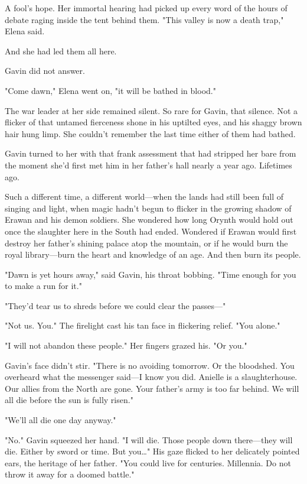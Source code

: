 A fool's hope.
Her immortal hearing had picked up every word of the hours of debate raging inside the tent behind them.
"This valley is now a death trap," Elena said.

And she had led them all here.

Gavin did not answer.

"Come dawn," Elena went on, "it will be bathed in blood."

The war leader at her side remained silent.
So rare for Gavin, that silence.
Not a flicker of that untamed fierceness shone in his uptilted eyes, and his shaggy brown hair hung limp.
She couldn't remember the last time either of them had bathed.

Gavin turned to her with that frank assessment that had stripped her bare from the moment she'd first met him in her father's hall nearly a year ago.
Lifetimes ago.

Such a different time, a different world---when the lands had still been full of singing and light, when magic hadn't begun to flicker in the growing shadow of Erawan and his demon soldiers.
She wondered how long Orynth would hold out once the slaughter here in the South had ended.
Wondered if Erawan would first destroy her father's shining palace atop the mountain, or if he would burn the royal library---burn the heart and knowledge of an age.
And then burn its people.

"Dawn is yet hours away," said Gavin, his throat bobbing.
"Time enough for you to make a run for it."

"They'd tear us to shreds before we could clear the passes---"

"Not us.
You."
The firelight cast his tan face in flickering relief.
"You alone."

"I will not abandon these people."
Her fingers grazed his.
"Or you."

Gavin's face didn't stir.
"There is no avoiding tomorrow.
Or the bloodshed.
You overheard what the messenger said---I know you did.
Anielle is a slaughterhouse.
Our allies from the North are gone.
Your father's army is too far behind.
We will all die before the sun is fully risen."

"We'll all die one day anyway."

"No."
Gavin squeezed her hand.
"I will die.
Those people down there---they will die.
Either by sword or time.
But you\ldots" His gaze flicked to her delicately pointed ears, the heritage of her father.
"You could live for centuries.
Millennia.
Do not throw it away for a doomed battle."

